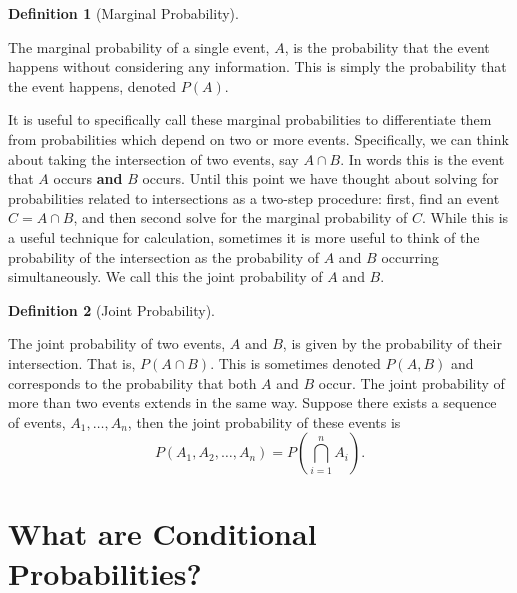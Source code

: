 \documentclass[
  letterpaper,
  DIV=11,
  numbers=noendperiod]{scrreprt}
\theoremstyle{definition}
\theoremstyle{definition}
\theoremstyle{definition}
\newtheorem{definition}{Definition}[chapter]
\theoremstyle{remark}
\begin{document}
\begin{definition}[Marginal
Probability]\protect\hypertarget{def-marginal-probability}{}\label{def-marginal-probability}

The marginal probability of a single event, \(A\), is the probability
that the event happens without considering any information. This is
simply the probability that the event happens, denoted \(P(A)\).

\end{definition}

It is useful to specifically call these marginal probabilities to
differentiate them from probabilities which depend on two or more
events. Specifically, we can think about taking the intersection of two
events, say \(A \cap B\). In words this is the event that \(A\) occurs
\textbf{and} \(B\) occurs. Until this point we have thought about
solving for probabilities related to intersections as a two-step
procedure: first, find an event \(C = A \cap B\), and then second solve
for the marginal probability of \(C\). While this is a useful technique
for calculation, sometimes it is more useful to think of the probability
of the intersection as the probability of \(A\) and \(B\) occurring
simultaneously. We call this the joint probability of \(A\) and \(B\).

\begin{definition}[Joint
Probability]\protect\hypertarget{def-joint-probability}{}\label{def-joint-probability}

The joint probability of two events, \(A\) and \(B\), is given by the
probability of their intersection. That is, \(P(A\cap B)\). This is
sometimes denoted \(P(A,B)\) and corresponds to the probability that
both \(A\) and \(B\) occur. The joint probability of more than two
events extends in the same way. Suppose there exists a sequence of
events, \(A_1, \dots, A_n\), then the joint probability of these events
is \[P(A_1,A_2,\dots,A_n) = P\left(\bigcap_{i=1}^n A_i\right).\]

\end{definition}

\section{What are Conditional
Probabilities?}\label{what-are-conditional-probabilities}
\end{document}
